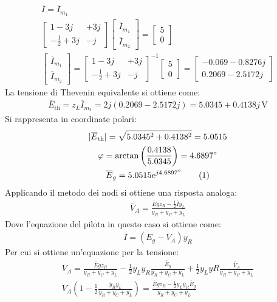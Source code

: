 \documentclass{article}
\newcommand{\tageq}{\tag{\stepcounter{equation}\theequation}}
\newcommand{\SI}[1]{\,\mathrm{#1}}
\begin{document}
\begin{gather*}
    \overline{I}=\overline{I}_{m_1}\\
    \begin{bmatrix}
        1-3j&+3j\\\displaystyle-\frac{1}{2}+3j&-j
    \end{bmatrix}\begin{bmatrix}
        \overline{I}_{m_1}\\\overline{I}_{m_2}
    \end{bmatrix}=\begin{bmatrix}
        5\\0
    \end{bmatrix}\\
    \begin{bmatrix}
        \overline{I}_{m_1}\\\overline{I}_{m_2}
    \end{bmatrix}=\begin{bmatrix}
        1-3j&+3j\\\displaystyle-\frac{1}{2}+3j&-j
    \end{bmatrix}^{-1}\begin{bmatrix}
        5\\0
    \end{bmatrix}=\begin{bmatrix}
        -0.069-0.8276j\\0.2069-2.5172j
    \end{bmatrix}
\end{gather*}
La tensione di Thevenin equivalente si ottiene come:
\begin{gather*}
    \overline{E}_\mathrm{th}=z_L\overline{I}_{m_2}=2j(0.2069-2.5172j)=5.0345+0.4138j\SI{V}
\end{gather*}
Si rappresenta in coordinate polari:
\begin{gather*}
    |\overline{E}_\mathrm{th}|=\sqrt{5.0345^2+0.4138^2}=5.0515\\
    \varphi=\arctan\left(\displaystyle\frac{0.4138}{5.0345}\right)=4.6897^{\circ}\\
    \overline{E}_g=5.0515e^{j4.6897^{\circ}}\tageq
\end{gather*}
Applicando il metodo dei nodi si ottiene una risposta analoga:
\begin{gather*}
    \overline{V}_A=\displaystyle\frac{\overline{E}gz_R-\frac{1}{2}\overline{I}y_L}{y_R+y_C+y_L}
\end{gather*}
Dove l'equazione del pilota in questo caso si ottiene come:
\begin{gather*}
    \overline{I}=(\overline{E}_g-\overline{V}_A)y_R
\end{gather*}
Per cui si ottiene un'equazione per la tensione:
\begin{gather*}
    \overline{V}_A=\displaystyle\frac{\overline{E}gz_R}{y_R+y_C+y_L}-\frac{1}{2}y_Ly_R\frac{\overline{E}_g}{y_R+y_C+y_L}+\frac{1}{2}y_LyR\frac{\overline{V}_A}{y_R+y_C+y_L}\\
    \overline{V}_A\left(\displaystyle1-\frac{1}{2}\frac{y_Ry_L}{y_R+y_C+y_L}\right)=\frac{\overline{E}gz_R-\frac{1}{2}y_Ly_R\overline{E}_g}{y_R+y_C+y_L}
\end{gather*}
\end{document}
